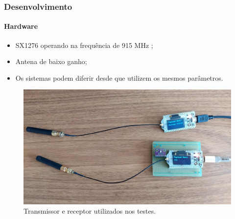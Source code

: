 \documentclass[aspectratio=169]{beamer}
\begin{document}
\begin{frame}

\frametitle{Desenvolvimento}
\framesubtitle{Hardware}

\begin{itemize}
    \item SX1276 operando na frequência de 915 MHz \cite{anatel_2017};
    \item Antena de baixo ganho;
    \item Os sistemas podem diferir desde que utilizem os mesmos parâmetros.
\end{itemize}

\begin{figure}
  \centering
  \includegraphics[scale=0.15]{img/Test.jpg}
  \caption{Transmissor e receptor utilizados nos testes.}
\end{figure}

\end{frame}
\end{document}
